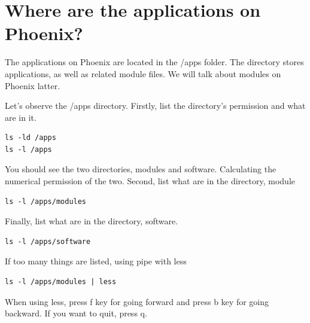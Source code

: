 \section{Where are the applications on Phoenix?}


The applications on Phoenix are located in the /apps folder. The directory stores applications, as well as related module files. We will talk about modules on Phoenix latter.\\


\begin{steps}
Let's observe the /apps directory. Firstly, list the directory's permission and what are in it.
\begin{lstlisting}
ls -ld /apps
ls -l /apps
\end{lstlisting}
You should see the two directories, modules and software. Calculating the numerical permission of the two.
Second, list what are in the directory, module
\begin{lstlisting}
ls -l /apps/modules
\end{lstlisting}
Finally, list what are in the directory, software. 
\begin{lstlisting}
ls -l /apps/software
\end{lstlisting}
If too many things are listed, using pipe with less
\begin{lstlisting}
ls -l /apps/modules | less
\end{lstlisting}
When using less, press f key for going forward and press b key for going backward. If you want to quit, press q.
\end{steps}

